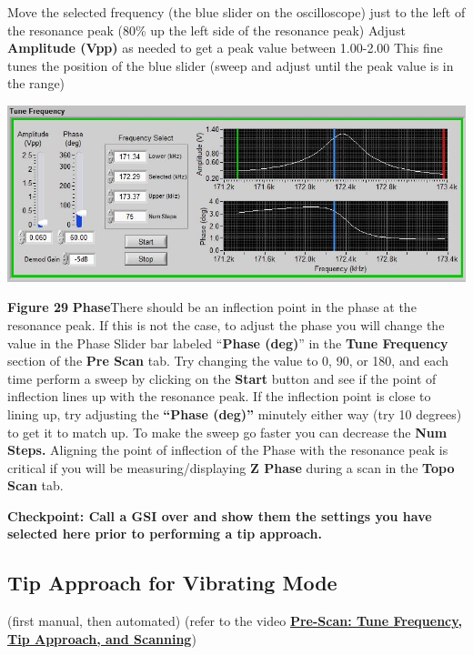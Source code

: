\documentclass{../lab}
\begin{document}
Move the selected frequency (the blue slider on the oscilloscope) just to the left of the resonance peak (80\% up the left side of the resonance peak)
Adjust \textbf{Amplitude (Vpp)} as needed to get a peak value between 1.00-2.00
This fine tunes the position of the blue slider
(sweep and adjust until the peak value is in the range)

\begin{center}
    \href{http://experimentationlab.berkeley.edu/sites/default/files/AFMImages/FreqPhase.JPG}{\includegraphics[width=0.5\linewidth]{images/FreqPhase.JPG}}
\end{center}


\textbf{Figure 29}
\textbf{P}\textbf{hase}
\textbf{​}There should be an inflection point in the phase at the resonance peak.
If this is not the case, to adjust the phase you will change the value in the Phase Slider bar labeled ``\textbf{Phase (deg)}'' in the \textbf{Tune Frequency }section of the \textbf{Pre Scan }tab.  Try changing the value to 0, 90, or 180, and each time perform a sweep by clicking on the \textbf{Start }button and see if the point of inflection lines up with the resonance peak.  If the inflection point is close to lining up, try adjusting the \textbf{``Phase (deg)'' }minutely either way (try 10 degrees) to get it to match up.  To make the sweep go faster you can decrease the \textbf{Num Steps.  }
Aligning the point of inflection of the Phase with the resonance peak is critical if you will be measuring/displaying \textbf{Z Phase }during a scan in the \textbf{Topo }\textbf{Scan }tab.

\textbf{Checkpoint: Call a GSI over and show them the settings you have selected here prior to performing a tip approach.}

\subsection{Tip Approach for Vibrating Mode}
\label{subsec:TipApproach}

(first manual, then automated) (refer to the video \href{http://experimentationlab.berkeley.edu/sites/default/files/prescan\_final2.mp4}{\textbf{Pre-Scan: Tune Frequency, Tip Approach, and Scanning}})
\end{document}
